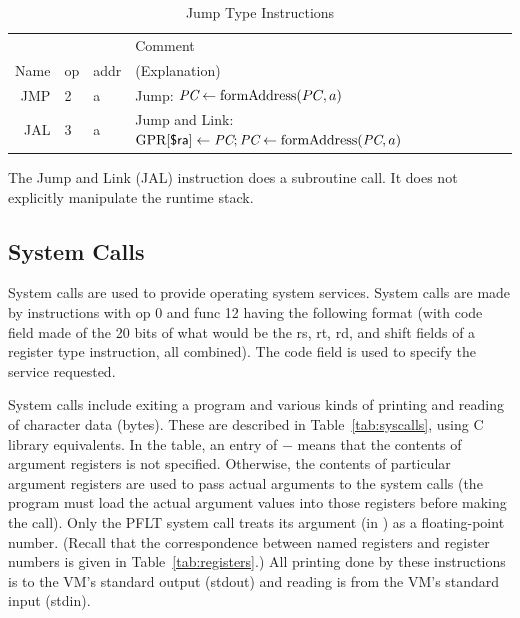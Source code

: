 \documentclass[11pt,letterpaper]{article}
\newcommand{\tabref}[1]{Table~\ref{#1}}  %
\begin{document}
\begin{table}[htbp]
\caption{Jump Type Instructions}
\label{tab:jumpinstrs}  
\begin{tabular}{|r|l|l|p{11cm}|}
\hline
~      & ~  & ~    & Comment \\
Name   & op & addr & (Explanation) \\
\hline
JMP    & 2  & a    & Jump: $\textit{PC} \leftarrow \textrm{formAddress}(PC,a)$ \\
\hline
JAL    & 3  & a    & Jump and Link: $\textrm{GPR[}\textsf{\$ra}\textrm{]} \leftarrow \textit{PC}; \textit{PC} \leftarrow \textrm{formAddress}(\textit{PC},a)$ \\
\hline
\end{tabular}
\end{table}

The Jump and Link (JAL) instruction does a subroutine call. It does
not explicitly manipulate the runtime stack.

\subsection{System Calls}
\label{sec:syscall}

System calls are used to provide operating system services.
System calls are made by instructions with op 0 and func 12 having the
following format (with code field made of the 20 bits of what would
be the rs, rt, rd, and shift fields of a register type instruction,
all combined).
The code field is used to specify the service requested.

System calls include exiting a program and various kinds of printing
and reading of character data (bytes).
These are described in \tabref{tab:syscalls},
using C library equivalents.
In the table, an entry of $-$ means that the contents of argument registers 
is not specified.
Otherwise, the contents of particular argument registers are used to
pass actual arguments to the system calls (the program must load the
actual argument values into those registers before making the call).
Only the PFLT system call treats its argument (in {\AZERO}) as a
floating-point number.
(Recall that the correspondence between named registers and register
numbers is given in \tabref{tab:registers}.)
All printing done by these instructions
is to the VM's standard output (stdout) and
reading is from the VM's standard input (stdin).
\end{document}
